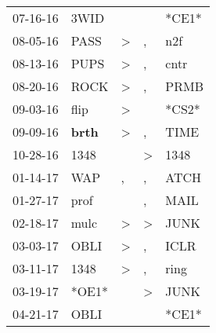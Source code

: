 \begin{supertabular}{p{0.07\textwidth}p{0.06\textwidth}p{0.02\textwidth}p{0.02\textwidth}p{0.06\textwidth}}
          07-16-16\textsuperscript{} &           3WID\textsuperscript{} &                  &                  &                            *CE1* \\
          08-05-16\textsuperscript{} &           PASS\textsuperscript{} &     \textgreater &                , &            n2f\textsuperscript{} \\
          08-13-16\textsuperscript{} &           PUPS\textsuperscript{} &     \textgreater &                , &           cntr\textsuperscript{} \\
          08-20-16\textsuperscript{} &           ROCK\textsuperscript{} &     \textgreater &                , &           PRMB\textsuperscript{} \\
          09-03-16\textsuperscript{} &           flip\textsuperscript{} &     \textgreater &                  &                            *CS2* \\
          09-09-16\textsuperscript{} &  \textbf{brth\textsuperscript{}} &     \textgreater &                , &           TIME\textsuperscript{} \\
          10-28-16\textsuperscript{} &           1348\textsuperscript{} &                  &     \textgreater &           1348\textsuperscript{} \\
          01-14-17\textsuperscript{} &            WAP\textsuperscript{} &                , &                , &           ATCH\textsuperscript{} \\
          01-27-17\textsuperscript{} &           prof\textsuperscript{} &                  &                , &           MAIL\textsuperscript{} \\
          02-18-17\textsuperscript{} &           mulc\textsuperscript{} &     \textgreater &     \textgreater &           JUNK\textsuperscript{} \\
          03-03-17\textsuperscript{} &           OBLI\textsuperscript{} &     \textgreater &                , &           ICLR\textsuperscript{} \\
          03-11-17\textsuperscript{} &           1348\textsuperscript{} &     \textgreater &                , &           ring\textsuperscript{} \\
          03-19-17\textsuperscript{} &                            *OE1* &                  &     \textgreater &           JUNK\textsuperscript{} \\
          04-21-17\textsuperscript{} &           OBLI\textsuperscript{} &                  &                  &                            *CE1* \\

\end{supertabular}
